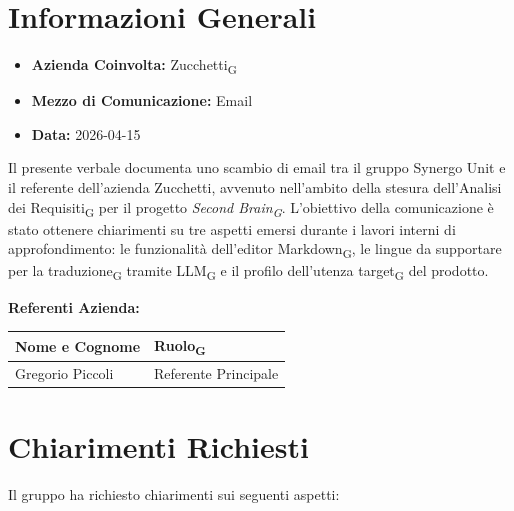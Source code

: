 \section{Informazioni Generali}
\begin{itemize}
	\item \textbf{Azienda Coinvolta:} Zucchetti\textsubscript{G}
	\item \textbf{Mezzo di Comunicazione:} Email
	\item \textbf{Data:} 2026-04-15
\end{itemize}

Il presente verbale documenta uno scambio di email tra il gruppo Synergo Unit
e il referente dell'azienda Zucchetti, avvenuto nell'ambito della stesura
dell'Analisi dei Requisiti\textsubscript{G} per il progetto \textit{Second Brain\textsubscript{G}}.
L'obiettivo della comunicazione è stato ottenere chiarimenti su tre aspetti
emersi durante i lavori interni di approfondimento: le funzionalità
dell'editor Markdown\textsubscript{G}, le lingue da supportare per la traduzione\textsubscript{G} tramite
LLM\textsubscript{G} e il profilo dell'utenza target\textsubscript{G} del prodotto.

\vspace{0.5cm}
\textbf{Referenti Azienda:}
\begin{table}[ht]
	\centering
	\renewcommand{\arraystretch}{1.2}
	\begin{tabularx}{\textwidth}{X l}
		\toprule
		\textbf{Nome e Cognome} & \textbf{Ruolo\textsubscript{G}} \\
		\midrule
		Gregorio Piccoli & Referente Principale \\
		\bottomrule
	\end{tabularx}
\end{table}

\section{Chiarimenti Richiesti}
Il gruppo ha richiesto chiarimenti sui seguenti aspetti:

